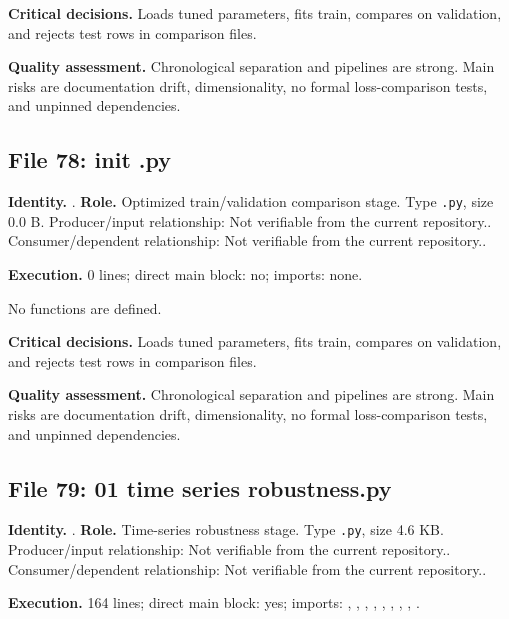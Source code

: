 \documentclass[
  11pt,
  a4paper]{article}
\newcounter{none} %
\begin{document}
\textbf{Critical decisions.} Loads tuned parameters, fits train,
compares on validation, and rejects test rows in comparison files.

\textbf{Quality assessment.} Chronological separation and pipelines are
strong. Main risks are documentation drift, dimensionality, no formal
loss-comparison tests, and unpinned dependencies.

\subsection{File 78: init .py}\label{file-7816641966154558433}

\textbf{Identity.} .
\textbf{Role.} Optimized train/validation comparison stage. Type
\texttt{.py}, size 0.0 B. Producer/input relationship: Not verifiable
from the current repository.. Consumer/dependent relationship: Not
verifiable from the current repository..

\textbf{Execution.} 0 lines; direct main block: no; imports: none.

No functions are defined.

\textbf{Critical decisions.} Loads tuned parameters, fits train,
compares on validation, and rejects test rows in comparison files.

\textbf{Quality assessment.} Chronological separation and pipelines are
strong. Main risks are documentation drift, dimensionality, no formal
loss-comparison tests, and unpinned dependencies.

\subsection{File 79: 01 time series
robustness.py}\label{file-5668380583423824153}

\textbf{Identity.}
.
\textbf{Role.} Time-series robustness stage. Type \texttt{.py}, size 4.6
KB. Producer/input relationship: Not verifiable from the current
repository.. Consumer/dependent relationship: Not verifiable from the
current repository..

\textbf{Execution.} 164 lines; direct main block: yes; imports:
, , ,
,
,
,
,
, .
\end{document}

